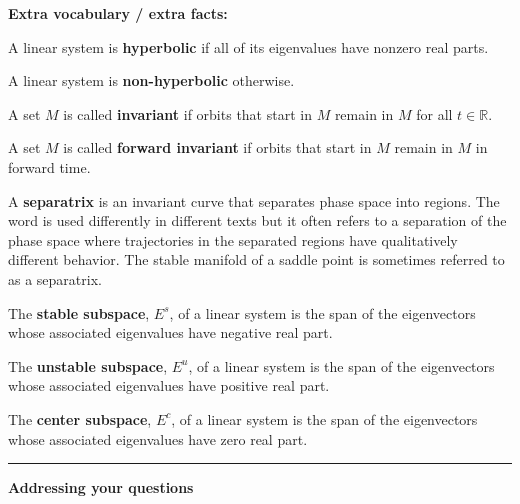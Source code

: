 \documentclass[12pt,letterpaper,noanswers]{exam}
\begin{document}
\noindent \textbf{Extra vocabulary / extra facts:}
\begin{tcolorbox}
A linear system is \textbf{hyperbolic} if all of its eigenvalues have nonzero real parts.

A linear system is \textbf{non-hyperbolic} otherwise.

A set $M$ is called \textbf{invariant} if orbits that start in $M$ remain in $M$ for all $t\in\mathbb{R}$.

A set $M$ is called \textbf{forward invariant} if orbits that start in $M$ remain in $M$ in forward time.

A \textbf{separatrix} is an invariant curve that separates phase space into regions.  The word is used differently in different texts but it often refers to a separation of the phase space where trajectories in the separated regions have qualitatively different behavior.  The stable manifold of a saddle point is sometimes referred to as a separatrix.


The \textbf{stable subspace}, $E^s$, of a linear system is the span of the eigenvectors whose associated eigenvalues have negative real part.

The \textbf{unstable subspace}, $E^u$, of a linear system is the span of the eigenvectors whose associated eigenvalues have positive real part.

The \textbf{center subspace}, $E^c$, of a linear system is the span of the eigenvectors whose associated eigenvalues have zero real part.

\end{tcolorbox}

\vspace{0.2cm}
\hrule
\vspace{0.2cm}

\noindent\textbf{Addressing your questions}
\end{document}
